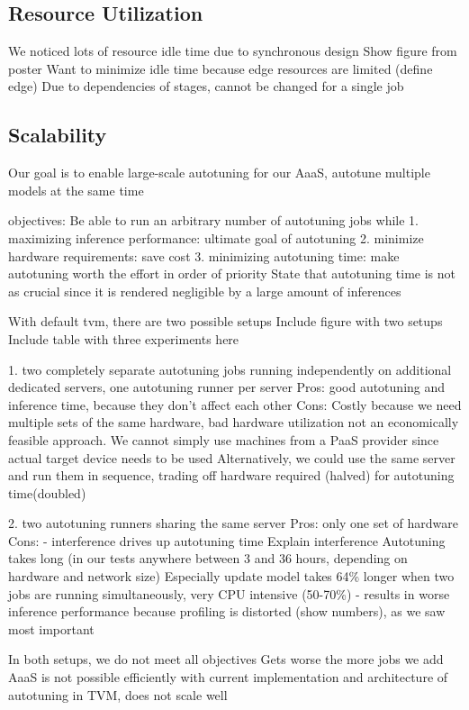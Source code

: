 \subsection{Resource Utilization}
We noticed lots of resource idle time due to synchronous design
Show figure from poster
Want to minimize idle time because edge resources are limited (define edge)
Due to dependencies of stages, cannot be changed for a single job

\subsection{Scalability}
Our goal is to enable large-scale autotuning for our AaaS, autotune multiple models at the same time

objectives:
Be able to run an arbitrary number of autotuning jobs while
1. maximizing inference performance: ultimate goal of autotuning
2. minimize hardware requirements: save cost
3. minimizing autotuning time: make autotuning worth the effort
in order of priority
State that autotuning time is not as crucial since it is rendered negligible by a large amount of inferences

With default tvm, there are two possible setups
Include figure with two setups
Include table with three experiments here

1. two completely separate autotuning jobs running independently on additional dedicated servers, one autotuning runner per server
Pros: good autotuning and inference time, because they don't affect each other
Cons: Costly because we need multiple sets of the same hardware, bad hardware utilization
not an economically feasible approach. We cannot simply use machines from a PaaS provider since actual target device needs to be used
Alternatively, we could use the same server and run them in sequence, trading off hardware required (halved) for autotuning time(doubled)

2. two autotuning runners sharing the same server
Pros: only one set of hardware
Cons:
- interference drives up autotuning time
Explain interference
Autotuning takes long (in our tests anywhere between 3 and 36 hours, depending on hardware and network size)
Especially update model takes 64\% longer when two jobs are running simultaneously, very CPU intensive (50-70\%)
- results in worse inference performance because profiling is distorted (show numbers), as we saw most important

In both setups, we do not meet all objectives
Gets worse the more jobs we add
AaaS is not possible efficiently with current implementation and architecture of autotuning in TVM, does not scale well

